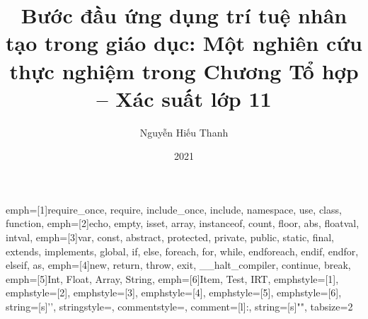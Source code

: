 \everymath{\displaystyle}

 {
	emph=[1]{require_once, require, include_once, include, namespace, use, class, function},
	emph=[2]{echo, empty, isset, array, instanceof, count, floor, abs, floatval, intval},
	emph=[3]{var, const, abstract, protected, private, public, static, final, extends, implements, global, if, else, foreach, for, while, endforeach, endif, endfor, elseif, as},
	emph=[4]{new, return, throw, exit, __halt_compiler, continue, break},
	emph=[5]{Int, Float, Array, String},
	emph=[6]{Item, Test, IRT},
	emphstyle=[1]\color{mBlue},
	emphstyle=[2]\color{mTeal},
	emphstyle=[3]\color{mBlue},
	emphstyle=[4]\color{mRed},
	emphstyle=[5]\color{mDeepOrange},
	emphstyle=[6]\color{mPink},
	string=[s]{'}{'},
}
 {
	stringstyle=\color{mTeal},
	commentstyle=\color{black},
	comment=[l]{:},
	string=[s]{"}{"},
	tabsize=2
}

\lstset{style=domthanh}
\renewcommand{\lstlistingname}{Code}
\renewcommand{\lstlistlistingname}{Danh sách Code minh họa}

\title{Bước đầu ứng dụng trí tuệ nhân tạo trong giáo dục: Một nghiên cứu thực nghiệm trong Chương Tổ hợp – Xác suất lớp 11}
\author{Nguyễn Hiếu Thanh}
\date{2021}


